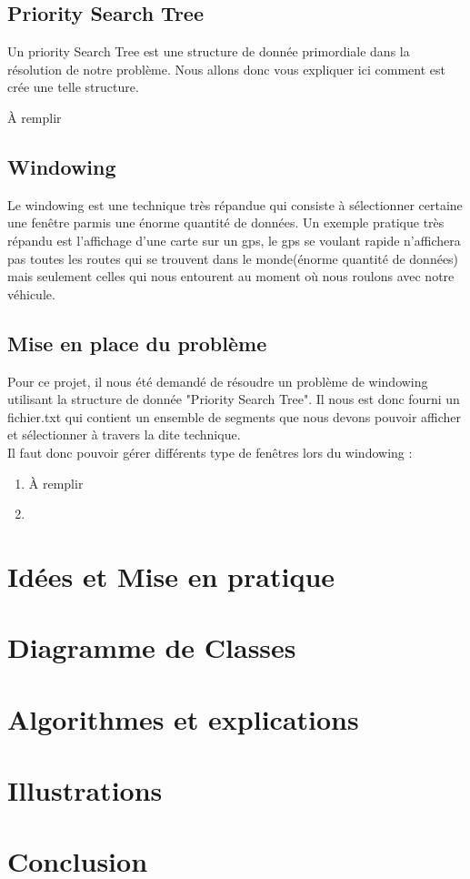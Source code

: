 \documentclass[10pt,a4paper]{article}
\begin{document}
\subsection{Priority Search Tree}
Un priority Search Tree est une structure de donnée primordiale dans la résolution de notre problème. Nous allons donc vous expliquer ici comment est crée une telle structure. \begin{Huge}
	À remplir
	\end{Huge}

\subsection{Windowing}
Le windowing est une technique très répandue qui consiste à sélectionner certaine une fenêtre parmis une énorme quantité de données. Un exemple pratique très répandu est l'affichage d'une carte sur un gps, le gps se voulant rapide n'affichera pas toutes les routes qui se trouvent dans le monde(énorme quantité de données) mais seulement celles qui nous entourent au moment où  nous roulons avec notre véhicule. 

\subsection{Mise en place du problème}
Pour ce projet, il nous été demandé de résoudre un problème de windowing utilisant la structure de donnée "Priority Search Tree". Il nous est donc fourni un fichier.txt qui contient un ensemble de segments que nous devons pouvoir afficher et sélectionner à travers la dite technique. \\
Il faut donc pouvoir gérer différents type de fenêtres lors du windowing :
\begin{enumerate}
	\item \begin{Huge}
	À remplir
	\end{Huge}
	\item 
	
\end{enumerate}

\section{Idées et Mise en pratique}
\section{Diagramme de Classes}
\section{Algorithmes et explications}

\section{Illustrations}

\section{Conclusion}
\end{document}
